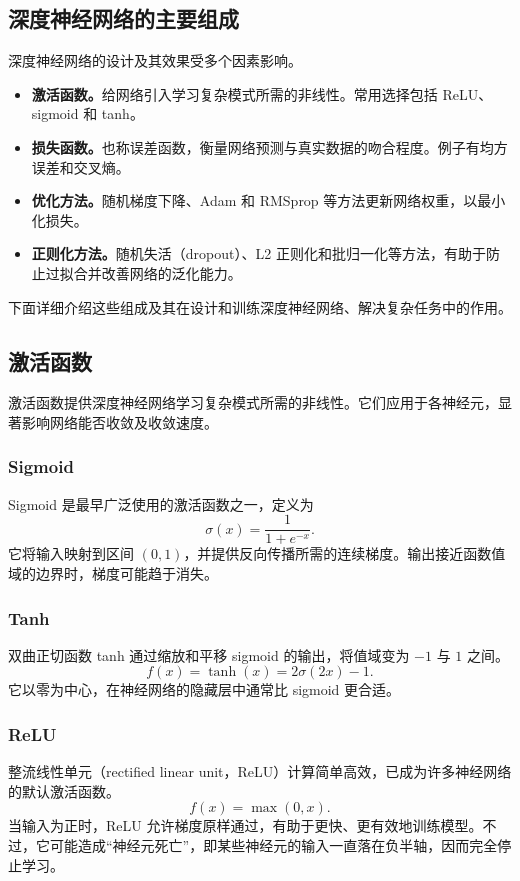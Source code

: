 \subsection{深度神经网络的主要组成}
深度神经网络的设计及其效果受多个因素影响。
\begin{itemize}
\item \textbf{激活函数。}给网络引入学习复杂模式所需的非线性。常用选择包括 ReLU、sigmoid 和 tanh。
\item \textbf{损失函数。}也称误差函数，衡量网络预测与真实数据的吻合程度。例子有均方误差和交叉熵。
\item \textbf{优化方法。}随机梯度下降、Adam 和 RMSprop 等方法更新网络权重，以最小化损失。
\item \textbf{正则化方法。}随机失活（dropout）、L2 正则化和批归一化等方法，有助于防止过拟合并改善网络的泛化能力。
\end{itemize}
下面详细介绍这些组成及其在设计和训练深度神经网络、解决复杂任务中的作用。

\subsection{激活函数}
\label{sec:appa-activations}
激活函数提供深度神经网络学习复杂模式所需的非线性。它们应用于各神经元，显著影响网络能否收敛及收敛速度。

\subsubsection{Sigmoid}
Sigmoid 是最早广泛使用的激活函数之一，定义为
\begin{equation}
\sigma(x)=\frac{1}{1+e^{-x}}.
\label{eq:appa-sigmoid}
\end{equation}
它将输入映射到区间 $(0,1)$，并提供反向传播所需的连续梯度。输出接近函数值域的边界时，梯度可能趋于消失。

\subsubsection{Tanh}
双曲正切函数 tanh 通过缩放和平移 sigmoid 的输出，将值域变为 $-1$ 与 $1$ 之间。
\begin{equation}
f(x)=\tanh(x)=2\sigma(2x)-1.
\label{eq:appa-tanh}
\end{equation}
它以零为中心，在神经网络的隐藏层中通常比 sigmoid 更合适。

\subsubsection{ReLU}
整流线性单元（rectified linear unit，ReLU）计算简单高效，已成为许多神经网络的默认激活函数。
\begin{equation}
f(x)=\max(0,x).
\label{eq:appa-relu}
\end{equation}
当输入为正时，ReLU 允许梯度原样通过，有助于更快、更有效地训练模型。不过，它可能造成“神经元死亡”，即某些神经元的输入一直落在负半轴，因而完全停止学习。

